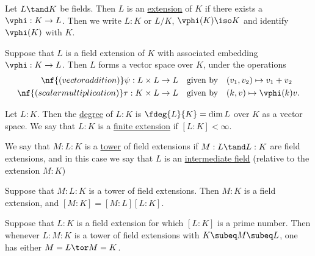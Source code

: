 \documentclass[a4paper]{article}
\begin{document}
\begin{tdefinition}
  Let \( L \tand K \) be fields.
  Then \( L \) is an \ul{extension} of \( K \) if there exists a \homo~\( \vphi: K \to L \).
  Then we write \( L:K \) or \( L/K \), \( \vphi(K)\iso K \) and identify \( \vphi(K) \) with \( K \).
\end{tdefinition}

\quad Suppose that \( L \) is a field extension of \( K \) with associated embedding \( \vphi: K \to L \).
  Then \( L \) forms a vector space over \( K \), under the operations \begin{align*}
    \nf{(vector addition) } \psi: L\times L &\to L \quad \text{given by} \quad (v_1,v_2) \mapsto v_1 + v_2 \\
    \nf{(scalar multiplication) } \tau : K\times  L &\to L \quad \text{given by} \quad (k,v) \mapsto \vphi(k)v.
  \end{align*}

\begin{tdefinition}
  Let \( L: K \).
  Then the \ul{degree} of \( L: K \) is \( \fdeg{L}{K}=\dim L \) over \( K \) as a vector space.
  We say that \( L : K \) is a \ul{finite extension} if \( [L: K] <\infty \).
\end{tdefinition}

\begin{tdefinition}
  We say that \( M : L : K \) is a \ul{tower} of field extensions if \( M : L \tand L: K \) are field extensions, and in this case we say that \( L \) is an \ul{intermediate field} (relative to the extension \( M : K \))
\end{tdefinition}

\begin{ttheorem}
  Suppose that \( M :L: K \) is a tower of field extensions.
  Then \( M : K \) is a field extension, and \( [M : K] = [M : L][L: K] \).
\end{ttheorem}

\begin{tcorollary}
  Suppose that \( L:K \) is a field extension for which \( [L: K] \) is a prime number.
  Then whenever \( L : M : K \) is a tower of field extensions with \( K \subeq M \subeq L \), one has either \( M= L \tor M= K \).
\end{tcorollary}
\end{document}
